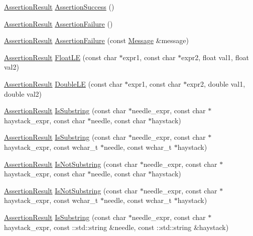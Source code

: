 \begin{DoxyCompactItemize}
\item 
\hyperlink{classtesting_1_1_assertion_result}{Assertion\-Result} \hyperlink{namespacetesting_ac1d0baedb17286c5c6c87bd1a45da8ac}{Assertion\-Success} ()
\item 
\hyperlink{classtesting_1_1_assertion_result}{Assertion\-Result} \hyperlink{namespacetesting_a75cb789614cb1c28c34627a4a3c053df}{Assertion\-Failure} ()
\item 
\hyperlink{classtesting_1_1_assertion_result}{Assertion\-Result} \hyperlink{namespacetesting_a56f59110a218942d2fc4695914b1685c}{Assertion\-Failure} (const \hyperlink{classtesting_1_1_message}{Message} \&message)
\item 
\hyperlink{classtesting_1_1_assertion_result}{Assertion\-Result} \hyperlink{namespacetesting_a2c9a2a391c72a7b02ea3024586e33af0}{Float\-L\-E} (const char $\ast$expr1, const char $\ast$expr2, float val1, float val2)
\item 
\hyperlink{classtesting_1_1_assertion_result}{Assertion\-Result} \hyperlink{namespacetesting_ae10e2bb304b74abd1b06a2d912a8b43b}{Double\-L\-E} (const char $\ast$expr1, const char $\ast$expr2, double val1, double val2)
\item 
\hyperlink{classtesting_1_1_assertion_result}{Assertion\-Result} \hyperlink{namespacetesting_a390c4f66fe7e9098117eb77e5fffa4ad}{Is\-Substring} (const char $\ast$needle\-\_\-expr, const char $\ast$haystack\-\_\-expr, const char $\ast$needle, const char $\ast$haystack)
\item 
\hyperlink{classtesting_1_1_assertion_result}{Assertion\-Result} \hyperlink{namespacetesting_aa1c82529c7591d2a9fd016de45dd9113}{Is\-Substring} (const char $\ast$needle\-\_\-expr, const char $\ast$haystack\-\_\-expr, const wchar\-\_\-t $\ast$needle, const wchar\-\_\-t $\ast$haystack)
\item 
\hyperlink{classtesting_1_1_assertion_result}{Assertion\-Result} \hyperlink{namespacetesting_a2288dcf4249f88af67dcd46544dc49a6}{Is\-Not\-Substring} (const char $\ast$needle\-\_\-expr, const char $\ast$haystack\-\_\-expr, const char $\ast$needle, const char $\ast$haystack)
\item 
\hyperlink{classtesting_1_1_assertion_result}{Assertion\-Result} \hyperlink{namespacetesting_a53e5c6e91ea429c43de7f4f57e33d166}{Is\-Not\-Substring} (const char $\ast$needle\-\_\-expr, const char $\ast$haystack\-\_\-expr, const wchar\-\_\-t $\ast$needle, const wchar\-\_\-t $\ast$haystack)
\item 
\hyperlink{classtesting_1_1_assertion_result}{Assertion\-Result} \hyperlink{namespacetesting_a571c7edcfc574269833ebe3e7d338ec5}{Is\-Substring} (const char $\ast$needle\-\_\-expr, const char $\ast$haystack\-\_\-expr, const \-::std\-::string \&needle, const \-::std\-::string \&haystack)

\end{DoxyCompactItemize}
